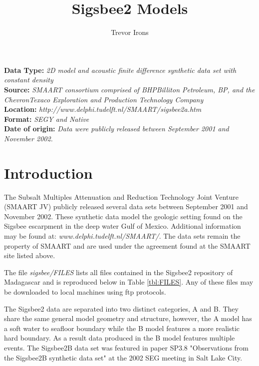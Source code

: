 \title{Sigsbee2 Models}
\author{Trevor Irons}
\shortpaper
\maketitle

\lstset{language=python,numbers=left,numberstyle=\tiny,showstringspaces=false}

\noindent
\textbf	{Data Type:} \emph{2D model and acoustic finite difference synthetic data set with constant density}\\
\textbf	{Source:} \emph{SMAART consortium comprised of BHPBilliton Petroleum, BP, and the ChevronTexaco Exploration 
and Production Technology Company}\\
\textbf {Location:} \emph{http://www.delphi.tudelft.nl/SMAART/sigsbee2a.htm}\\
\textbf	{Format:} \emph{SEGY and Native} \\
\textbf{Date of origin:} \emph{Data were publicly released between September 2001 and November 2002.}\\ 

\section{Introduction}
The Subsalt Multiples Attenuation and Reduction Technology Joint Venture (SMAART JV) publicly released several data sets 
between September 2001 and November 2002.  These synthetic data model the geologic setting found on the Sigsbee escarpment 
in the deep water Gulf of Mexico.  Additional information may be found at: \emph{www.delphi.tudelft.nl/SMAART/}.  
The data sets remain the property of SMAART and are used under the agreement found at the SMAART site listed above.  

The file \emph{sigsbee/FILES} lists all files contained in the Sigsbee2 repository of Madagascar and is reproduced below in
Table \ref{tbl:FILES}.  Any of these files may be downloaded to local machines using ftp protocols.  

The Sigsbee2 data are separated into two distinct categories, A and B.  They share the same general model geometry and structure,
however, the A model has a soft water to seafloor boundary while the B model features a more realistic hard boundary.  As a result 
data produced in the B model features multiple events.  The Sigsbee2B data set was featured in paper SP3.8 "Observations from the 
Sigsbee2B synthetic data set" at the 2002 SEG meeting in Salt Lake City.  

